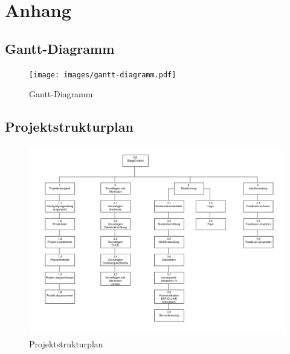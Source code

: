 \chapter*{Anhang}
\section*{Gantt-Diagramm}

\begin{figure}[H]
	\centering
	\texttt{[image: images/gantt-diagramm.pdf]}
	\caption[Gantt-Diagramm]{Gantt-Diagramm}
	\label{fig:gantt-diagramm}
\end{figure}


\section*{Projektstrukturplan}
\begin{figure}[H]
	\centering
	\includegraphics[width=1.0\linewidth]{images/PSP.png}
	\caption[Projektstrukturplan]{Projektstrukturplan}
	\label{fig:projektstrukturplan}
\end{figure}
\newpage

